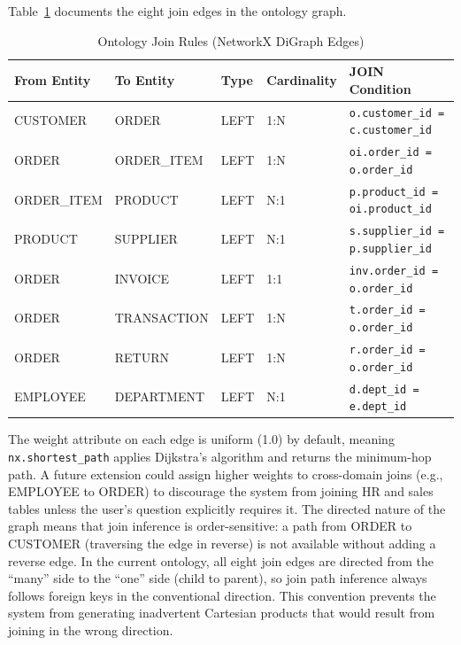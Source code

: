 \documentclass[12pt,a4paper]{report}
\begin{document}
Table~\ref{tab:join-rules} documents the eight join edges in the ontology graph.

\begin{table}[H]
  \centering
  \caption{Ontology Join Rules (NetworkX DiGraph Edges)}
  \label{tab:join-rules}
  \renewcommand{\arraystretch}{1.2}
  \begin{tabularx}{\textwidth}{@{}llllX@{}}
    \toprule
    \textbf{From Entity} & \textbf{To Entity} & \textbf{Type} & \textbf{Cardinality} & \textbf{JOIN Condition} \\
    \midrule
    CUSTOMER    & ORDER       & LEFT  & 1:N & \texttt{o.customer\_id = c.customer\_id} \\
    ORDER       & ORDER\_ITEM & LEFT  & 1:N & \texttt{oi.order\_id = o.order\_id} \\
    ORDER\_ITEM & PRODUCT     & LEFT  & N:1 & \texttt{p.product\_id = oi.product\_id} \\
    PRODUCT     & SUPPLIER    & LEFT  & N:1 & \texttt{s.supplier\_id = p.supplier\_id} \\
    ORDER       & INVOICE     & LEFT  & 1:1 & \texttt{inv.order\_id = o.order\_id} \\
    ORDER       & TRANSACTION & LEFT  & 1:N & \texttt{t.order\_id = o.order\_id} \\
    ORDER       & RETURN      & LEFT  & 1:N & \texttt{r.order\_id = o.order\_id} \\
    EMPLOYEE    & DEPARTMENT  & LEFT  & N:1 & \texttt{d.dept\_id = e.dept\_id} \\
    \bottomrule
  \end{tabularx}
\end{table}

The weight attribute on each edge is uniform (1.0) by default, meaning \texttt{nx.shortest\_path} applies Dijkstra's algorithm and returns the minimum-hop path. A future extension could assign higher weights to cross-domain joins (e.g., EMPLOYEE to ORDER) to discourage the system from joining HR and sales tables unless the user's question explicitly requires it. The directed nature of the graph means that join inference is order-sensitive: a path from ORDER to CUSTOMER (traversing the edge in reverse) is not available without adding a reverse edge. In the current ontology, all eight join edges are directed from the ``many'' side to the ``one'' side (child to parent), so join path inference always follows foreign keys in the conventional direction. This convention prevents the system from generating inadvertent Cartesian products that would result from joining in the wrong direction.
\end{document}
